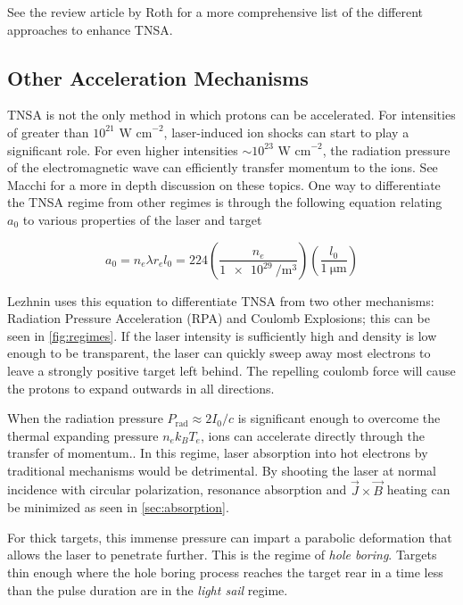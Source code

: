See the review article by Roth\cite{Roth_2016_CERN_TNSA} for a more comprehensive list of the different approaches to enhance TNSA.

\subsection{Other Acceleration Mechanisms}
TNSA is not the only method in which protons can be accelerated. For intensities of greater than $10^{21} \text{ W cm}^{-2}$, laser-induced ion shocks can start to play a significant role\cite{Fuchs_2005_Nat}. For even higher intensities $\sim 10^{23} \text{ W cm}^{-2}$, the radiation pressure of the electromagnetic wave can efficiently transfer momentum to the ions\cite{Fuchs_2005_Nat}. See Macchi\cite{Macchi_2013_RevModPhys} for a more in depth discussion on these topics. One way to differentiate the TNSA regime from other regimes is through the following equation relating $a_0$ to various properties of the laser and target

\begin{equation}
	a_0 = n_e \lambda r_e l_0 = 224 \left(\frac{n_e}{\SI{1e29}{\per \meter \cubed}}\right) \left(\frac{l_0}{\SI{1}{\micro \meter}} \right) \label{eq:acc_regime}
\end{equation}

Lezhnin\cite{Lezhnin_2015_PoP} uses this equation to differentiate TNSA from two other mechanisms: Radiation Pressure Acceleration (RPA) and Coulomb Explosions; this can be seen in \cref{fig:regimes}. If the laser intensity is sufficiently high and density is low enough to be transparent, the laser can quickly sweep away most electrons to leave a strongly positive target left behind. The repelling coulomb force will cause the protons to expand outwards in all directions.

When the radiation pressure $P_\text{rad} \approx 2 I_0 / c$ is significant enough to overcome the thermal expanding pressure $n_e k_B T_e$, ions can accelerate directly through the transfer of momentum.\cite{Macchi_2013_RevModPhys}. In this regime, laser absorption into hot electrons by traditional mechanisms would be detrimental. By shooting the laser at normal incidence with circular polarization, resonance absorption and $\vec{J} \times \vec{B}$ heating can be minimized as seen in \cref{sec:absorption}.

For thick targets, this immense pressure can impart a parabolic deformation that allows the laser to penetrate further. This is the regime of \emph{hole boring}. Targets thin enough where the hole boring process reaches the target rear in a time less than the pulse duration are in the \emph{light sail} regime. 

